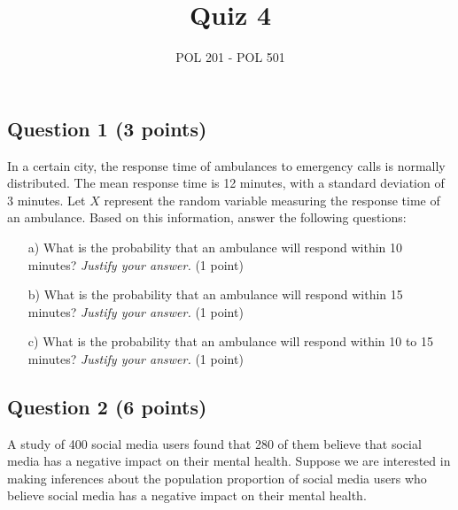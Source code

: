 \documentclass{article}
\title{Quiz 4}
\author{POL 201 - POL 501}
\date{}
\begin{document}
\maketitle

\subsection*{Question 1 (3 points)}
In a certain city, the response time of ambulances to emergency calls is normally distributed. The mean response time is 12 minutes, with a standard deviation of 3 minutes. Let \(X\) represent the random variable measuring the response time of an ambulance. \newline
Based on this information, answer the following questions:

\begin{enumerate}
\item[a)] What is the probability that an ambulance will respond within 10 minutes? \emph{Justify your answer.} (1 point)
\begin{center}
\end{center}

\item[b)] What is the probability that an ambulance will respond within 15 minutes? \emph{Justify your answer.} (1 point)
\begin{center}
\end{center}

\item[c)] What is the probability that an ambulance will respond within 10 to 15 minutes? \emph{Justify your answer.} (1 point)

\begin{center}
\end{center}

\end{enumerate}

\subsection*{Question 2 (6 points)}
A study of 400 social media users found that 280 of them believe that social media has a negative impact on their mental health. Suppose we are interested in making inferences about the population proportion of social media users who believe social media has a negative impact on their mental health.
\end{document}
